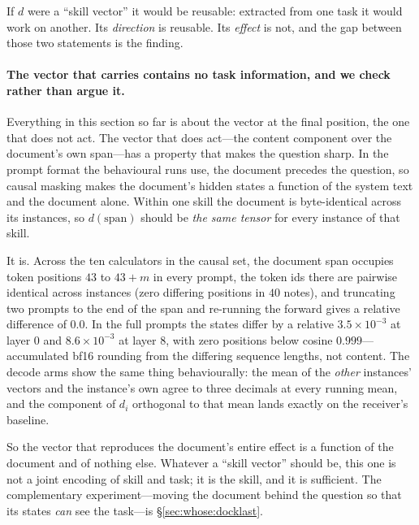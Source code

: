 \documentclass{article}
\newcommand{\dvec}{\ensuremath{d}}
\begin{document}
If $\dvec$ were a ``skill vector'' it would be reusable: extracted from one task
it would work on another. Its \emph{direction} is reusable. Its \emph{effect}
is not, and the gap between those two statements is the finding.

\paragraph{The vector that carries contains no task information, and we check
rather than argue it.} Everything in this section so far is about the vector at
the final position, the one that does not act. The vector that does act---the
content component over the document's own span---has a property that makes the
question sharp. In the prompt format the behavioural runs use, the document
precedes the question, so causal masking makes the document's hidden states a
function of the system text and the document alone. Within one skill the
document is byte-identical across its instances, so $\dvec(\text{span})$ should
be \emph{the same tensor} for every instance of that skill.

It is. Across the ten calculators in the causal set, the document span occupies
token positions $43$ to $43+m$ in every prompt, the token ids there are
pairwise identical across instances (zero differing positions in $40$ notes),
and truncating two prompts to the end of the span and re-running the forward
gives a relative difference of $0.0$. In the full prompts the states differ by a
relative $3.5\times10^{-3}$ at layer 0 and $8.6\times10^{-3}$ at layer 8, with
zero positions below cosine $0.999$---accumulated bf16 rounding from the
differing sequence lengths, not content. The decode arms show the same thing
behaviourally: the mean of the \emph{other} instances' vectors and the
instance's own agree to three decimals at every running mean, and the component
of $\dvec_i$ orthogonal to that mean lands exactly on the receiver's baseline.

So the vector that reproduces the document's entire effect is a function of the
document and of nothing else. Whatever a ``skill vector'' should be, this one is
not a joint encoding of skill and task; it is the skill, and it is sufficient.
The complementary experiment---moving the document behind the question so that
its states \emph{can} see the task---is \S\ref{sec:whose:docklast}.
\end{document}
